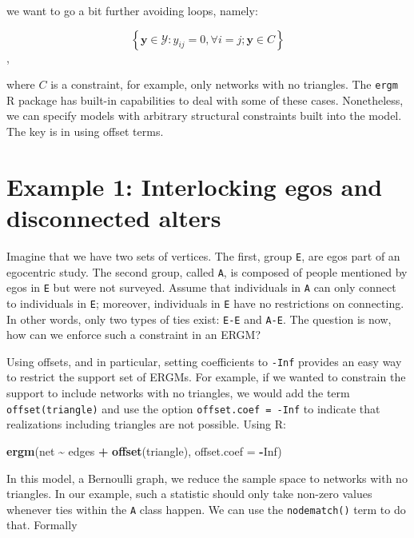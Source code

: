 \documentclass[
]{book}
\newenvironment{Shaded}{\begin{snugshade}}{\end{snugshade}}
\newcommand{\AttributeTok}[1]{\textcolor[rgb]{0.13,0.29,0.53}{#1}}
\newcommand{\ConstantTok}[1]{\textcolor[rgb]{0.56,0.35,0.01}{#1}}
\newcommand{\FunctionTok}[1]{\textcolor[rgb]{0.13,0.29,0.53}{\textbf{#1}}}
\newcommand{\NormalTok}[1]{#1}
\newcommand{\SpecialCharTok}[1]{\textcolor[rgb]{0.81,0.36,0.00}{\textbf{#1}}}
\begin{document}
\noindent we want to go a bit further avoiding loops, namely:

\[
\left\{\mathbf{y} \in \mathcal{Y}: y_{ij} = 0, \forall i = j; \mathbf{y} \in C\right\}
\],

\noindent where \(C\) is a constraint, for example, only networks with no triangles. The \texttt{ergm} R package has built-in capabilities to deal with some of these cases. Nonetheless, we can specify models with arbitrary structural constraints built into the model. The key is in using offset terms.

\hypertarget{example-1-interlocking-egos-and-disconnected-alters}{%
\section{Example 1: Interlocking egos and disconnected alters}\label{example-1-interlocking-egos-and-disconnected-alters}}

Imagine that we have two sets of vertices. The first, group \texttt{E}, are egos part of an egocentric study. The second group, called \texttt{A}, is composed of people mentioned by egos in \texttt{E} but were not surveyed. Assume that individuals in \texttt{A} can only connect to individuals in \texttt{E}; moreover, individuals in \texttt{E} have no restrictions on connecting. In other words, only two types of ties exist: \texttt{E-E} and \texttt{A-E}. The question is now, how can we enforce such a constraint in an ERGM?

Using offsets, and in particular, setting coefficients to \texttt{-Inf} provides an easy way to restrict the support set of ERGMs. For example, if we wanted to constrain the support to include networks with no triangles, we would add the term \texttt{offset(triangle)} and use the option \texttt{offset.coef\ =\ -Inf} to indicate that realizations including triangles are not possible. Using R:

\begin{Shaded}
\begin{Highlighting}[]
\FunctionTok{ergm}\NormalTok{(net }\SpecialCharTok{\textasciitilde{}}\NormalTok{ edges }\SpecialCharTok{+} \FunctionTok{offset}\NormalTok{(triangle), }\AttributeTok{offset.coef =} \SpecialCharTok{{-}}\ConstantTok{Inf}\NormalTok{)}
\end{Highlighting}
\end{Shaded}

In this model, a Bernoulli graph, we reduce the sample space to networks with no triangles. In our example, such a statistic should only take non-zero values whenever ties within the \texttt{A} class happen. We can use the \texttt{nodematch()} term to do that. Formally
\end{document}

